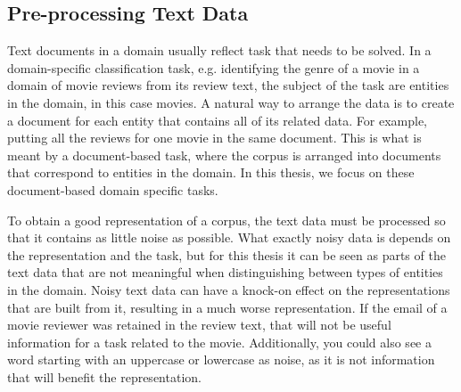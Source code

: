 



\subsection{Pre-processing Text Data}\label{ch2:data}



Text documents in a domain usually reflect task that needs to be solved. In a domain-specific classification task, e.g. identifying the genre of a movie in a domain of movie reviews from its review text, the subject of the task are entities in the domain, in this case movies. A natural way to arrange the data is to create a document for each entity that contains all of its related data. For example, putting all the reviews for one movie in the same document. This is what is meant by a document-based task, where the corpus is arranged into documents that correspond to entities in the domain. In this thesis, we focus on these document-based domain specific tasks. 







To obtain a good representation of a corpus, the text data must  be processed so that it contains as little noise as possible. What exactly noisy data is depends on the representation and the task, but for this thesis it can be seen as parts of the text data that are not meaningful when distinguishing between types of entities in the domain. Noisy text data can have a knock-on effect on the representations that are built from it, resulting in a much worse representation. If the email of a movie reviewer was retained in the review text, that will not be useful information for a task related to the movie. Additionally, you could also see  a word starting with an uppercase or lowercase as noise, as it is not information that will benefit the representation. %



